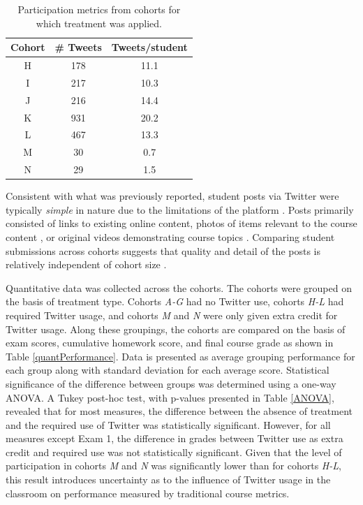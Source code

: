\documentclass[12pt]{article}
\begin{document}
\begin{table}[H]
\caption{Participation metrics from cohorts for which treatment was applied.}
\begin{center}
\label{participation}
\begin{tabular}{ccc}
\hline
 Cohort & \# Tweets & Tweets/student \\
\hline
 H & 178 & 11.1 \\
 I & 217 & 10.3 \\
 J & 216 & 14.4 \\
 K & 931 & 20.2 \\
 L & 467 & 13.3 \\
 M & 30 & 0.7 \\
 N & 29 & 1.5 \\
\hline
\end{tabular}
\end{center}
\end{table}

Consistent with what was previously reported, student posts via Twitter were typically \textit{simple} in nature due to the limitations of the platform \cite{berg_evaluation_2014}. Posts primarily consisted of links to existing online content, photos of items relevant to the course content \cite{berg_relationship_2015}, or original videos demonstrating course topics \cite{cleveland_impact_2014}. Comparing student submissions across cohorts suggests that quality and detail of the posts is relatively independent of cohort size \cite{berg_relationship_2015}.

Quantitative data was collected across the cohorts. The cohorts were grouped on the basis of treatment type. Cohorts \textit{A-G} had no Twitter use, cohorts \textit{H-L} had required Twitter usage, and cohorts \textit{M} and \textit{N} were only given extra credit for Twitter usage. Along these groupings, the cohorts are compared on the basis of exam scores, cumulative homework score, and final course grade as shown in Table \ref{quantPerformance}. Data is presented as average grouping performance for each group along with standard deviation for each average score. Statistical significance of the difference between groups was determined using a one-way ANOVA. A Tukey post-hoc test, with p-values presented in Table \ref{ANOVA}, revealed that for most measures, the difference between the absence of treatment and the required use of Twitter was statistically significant. However, for all measures except Exam 1, the difference in grades between Twitter use as extra credit and required use was not statistically significant. Given that the level of participation in cohorts \textit{M} and \textit{N} was significantly lower than for cohorts \textit{H-L}, this result introduces uncertainty as to the influence of Twitter usage in the classroom on performance measured by traditional course metrics.
\end{document}
